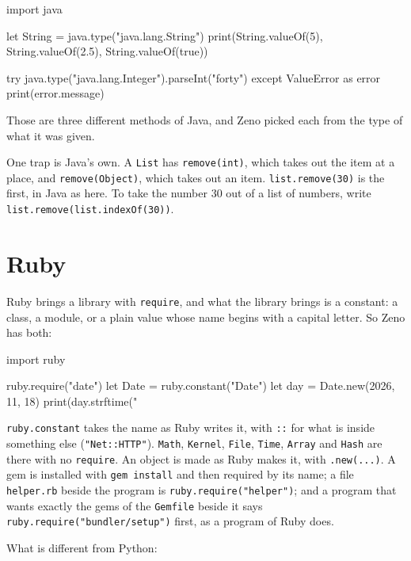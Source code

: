 \begin{zeno}[file=valueof.zeno]
import java

let String = java.type("java.lang.String")
print(String.valueOf(5), String.valueOf(2.5), String.valueOf(true))

try {
    java.type("java.lang.Integer").parseInt("forty")
} except ValueError as error {
    print(error.message)
}
\end{zeno}

Those are three different methods of Java, and Zeno picked each from
the type of what it was given.

\begin{note}
One trap is Java's own. A \verb|List| has \verb|remove(int)|, which
takes out the item at a place, and \verb|remove(Object)|, which takes
out an item. \verb|list.remove(30)| is the first, in Java as here. To
take the number 30 out of a list of numbers, write
\verb|list.remove(list.indexOf(30))|.
\end{note}

\section{Ruby}

Ruby brings a library with \verb|require|, and what the library
brings is a constant: a class, a module, or a plain value whose name
begins with a capital letter. So Zeno has both:

\begin{zeno}[file=weekday.zeno, dir=ruby]
import ruby

ruby.require("date")
let Date = ruby.constant("Date")
let day = Date.new(2026, 11, 18)
print(day.strftime("%
\end{zeno}

\verb|ruby.constant| takes the name as Ruby writes it, with \verb|::|
for what is inside something else (\verb|"Net::HTTP"|). \verb|Math|,
\verb|Kernel|, \verb|File|, \verb|Time|, \verb|Array| and \verb|Hash|
are there with no \verb|require|. An object is made as Ruby makes it,
with \verb|.new(...)|. A gem is installed with \verb|gem install| and
then required by its name; a file \verb|helper.rb| beside the program
is \verb|ruby.require("helper")|; and a program that wants exactly the
gems of the \verb|Gemfile| beside it says
\verb|ruby.require("bundler/setup")| first, as a program of Ruby does.

What is different from Python:

